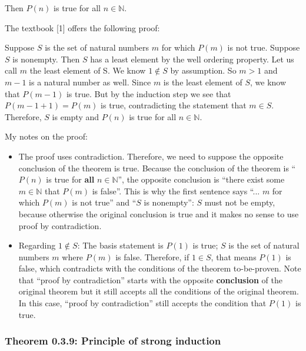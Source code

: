 \documentclass[12pt, letterpaper, oneside]{book}
\begin{document}
Then $P(n)$ is true for all $n \in \mathbb{N}$.

The textbook [1] offers the following proof:

\begin{displayquote}
  Suppose $S$ is the set of natural numbers $m$ for which $P(m)$ is not true.
  Suppose $S$ is nonempty. Then $S$ has a least element by the well ordering
  property. Let us call $m$ the least element of S. We know $1 \notin S$ by
  assumption. So $m > 1$ and $m - 1$ is a natural number as well. Since $m$ is
  the least element of $S$, we know that $P(m-1)$ is true. But by the induction
  step we see that $P(m-1+1) = P(m)$ is true, contradicting the statement that
  $m \in S$. Therefore, $S$ is empty and $P(n)$ is true for all $n \in
    \mathbb{N}$.
\end{displayquote}

My notes on the proof:

\begin{itemize}
  \item The proof uses contradiction. Therefore, we need to suppose the opposite
        conclusion of the theorem is true. Because the conclusion of the theorem is
        ``$P(n)$ is true for \textbf{all} $n \in \mathbb{N}$'', the opposite
        conclusion is ``there exist some $m \in \mathbb{N}$ that $P(m)$ is false''.
        This is why the first sentence says ``... $m$ for which $P(m)$ is not true''
        and ``$S$ is nonempty'': $S$ must not be empty, because otherwise the
        original conclusion is true and it makes no sense to use proof by
        contradiction.
  \item Regarding $1 \notin S$: The basis statement is $P(1)$ is true; $S$ is
        the set of natural numbers $m$ where $P(m)$ is false. Therefore, if $1 \in
          S$, that means $P(1)$ is false, which contradicts with the conditions of
        the theorem to-be-proven. Note that ``proof by contradiction'' starts with
        the opposite \textbf{conclusion} of the original theorem but it still
        accepts all the conditions of the original theorem. In this case, ``proof
        by contradiction'' still accepts the condition that $P(1)$ is true.
\end{itemize}

\subsubsection{Theorem 0.3.9: Principle of strong induction}
\end{document}
